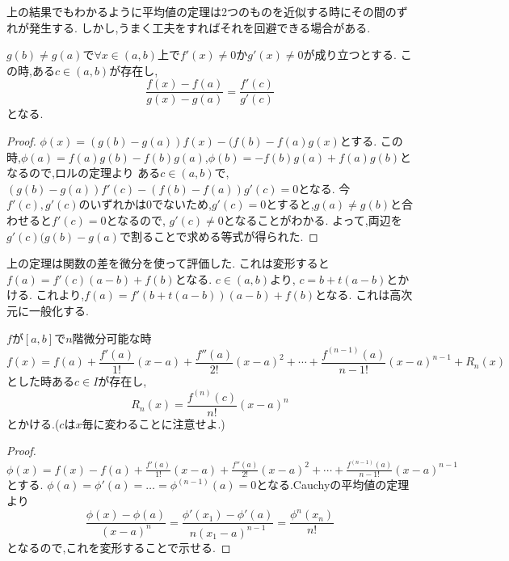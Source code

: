 上の結果でもわかるように平均値の定理は2つのものを近似する時にその間のずれが発生する.
しかし,うまく工夫をすればそれを回避できる場合がある.

\begin{thm}[Cauchyの平均値の定理]
$g(b) \neq g(a)$で$\forall x \in (a,b)$上で$f'(x) \neq 0$か$g'(x) \neq 0$が成り立つとする.
この時,ある$c \in (a,b)$が存在し,
\begin{equation*}
  \frac{f(x) - f(a)}{g(x) - g(a)} = \frac{f'(c)}{g'(c)}
\end{equation*}
となる.
\end{thm}
\begin{proof}
$\phi(x) = (g(b) - g(a))f(x) - (f(b) - f(a)g(x)$とする.
この時,$\phi(a) = f(a)g(b) - f(b)g(a)$,$\phi(b) = -f(b)g(a) + f(a)g(b)$となるので,ロルの定理より
ある$c \in (a,b)$で,$(g(b) - g(a))f'(c) - (f(b) - f(a))g'(c) = 0$となる.
今$f'(c),g'(c)$のいずれかは0でないため,$g'(c) = 0$とすると,$g(a) \neq g(b)$と合わせると$f'(c) = 0$となるので,
$g'(c) \neq 0$となることがわかる.
よって,両辺を$g'(c)(g(b) - g(a)$で割ることで求める等式が得られた.
\end{proof}



上の定理は関数の差を微分を使って評価した.
これは変形すると$f(a) = f'(c)(a-b) + f(b)$となる.
$c \in (a,b)$より, $c = b + t(a-b)$とかける.
これより,$f(a) = f'(b + t(a-b))(a-b) + f(b)$となる.
これは高次元に一般化する.


\begin{thm}[テイラーの定理]
$f$が$[a, b]$で$n$階微分可能な時
\begin{equation*}
  f(x) = f(a) + \frac{f'(a)}{1!}(x-a) + \frac{f''(a)}{2!}(x-a)^2 + \cdots + \frac{f^{(n-1)}(a)}{n-1!}(x-a)^{n-1} + R_n(x)
\end{equation*}
とした時ある$c \in I$が存在し,
\begin{equation*}
R_n(x) = \frac{f^{(n)}(c)}{n!}(x-a)^n
\end{equation*}
とかける.($c$は$x$毎に変わることに注意せよ.)
\end{thm}
\begin{proof}
$ \phi(x) = f(x) - f(a) + \frac{f'(a)}{1!}(x-a) + \frac{f''(a)}{2!}(x-a)^2 + \cdots + \frac{f^{(n-1)}(a)}{n-1!}(x-a)^{n-1}$とする.
$\phi(a) = \phi'(a) = \ldots = \phi^{(n-1)}(a) = 0$となる.Cauchyの平均値の定理より
\begin{equation*}
\frac{\phi(x) - \phi(a)}{(x-a)^n} = \frac{\phi'(x_1) - \phi'(a)}{n(x_1 -a)^{n-1}} = \frac{\phi^{n}(x_n)}{n!}
\end{equation*}
となるので,これを変形することで示せる.
\end{proof}

